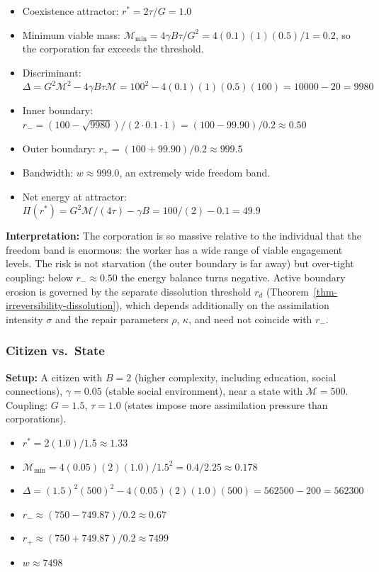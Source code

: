 \documentclass[11pt]{article}
\theoremstyle{plain}
\theoremstyle{definition}
\theoremstyle{remark}
\let\origsubsubsection\subsubsection
\renewcommand{\subsubsection}{\needspace{4\baselineskip}\origsubsubsection}
\providecommand{\tightlist}{%
  \setlength{\itemsep}{0pt}\setlength{\parskip}{0pt}}
\begin{document}
\begin{itemize}
\tightlist
\item
  Coexistence attractor: \(r^* = 2\tau/G = 1.0\)
\item
  Minimum viable mass:
  \(\mathcal{M}_{\min} = 4\gamma B \tau / G^2 = 4(0.1)(1)(0.5)/1 = 0.2\),
  so the corporation far exceeds the threshold.
\item
  Discriminant:
  \(\Delta = G^2\mathcal{M}^2 - 4\gamma B \tau \mathcal{M} = 100^2 - 4(0.1)(1)(0.5)(100) = 10000 - 20 = 9980\)
\item
  Inner boundary:
  \(r_- = (100 - \sqrt{9980})/(2 \cdot 0.1 \cdot 1) = (100 - 99.90)/0.2 \approx 0.50\)
\item
  Outer boundary: \(r_+ = (100 + 99.90)/0.2 \approx 999.5\)
\item
  Bandwidth: \(w \approx 999.0\), an extremely wide freedom band.
\item
  Net energy at attractor:
  \(\Pi(r^*) = G^2\mathcal{M}/(4\tau) - \gamma B = 100/(2) - 0.1 = 49.9\)
\end{itemize}

\textbf{Interpretation:} The corporation is so massive relative to the
individual that the freedom band is enormous: the worker has a wide
range of viable engagement levels. The risk is not starvation (the outer
boundary is far away) but over-tight coupling: below
\(r_- \approx 0.50\) the energy balance turns negative. Active boundary
erosion is governed by the separate dissolution threshold \(r_d\)
(Theorem~\ref{thm-irreversibility-dissolution}), which depends
additionally on the assimilation intensity \(\sigma\) and the repair
parameters \(\rho\), \(\kappa\), and need not coincide with \(r_-\).

\subsubsection{Citizen vs.~State}\label{citizen-vs.-state}

\textbf{Setup:} A citizen with \(B = 2\) (higher complexity, including
education, social connections), \(\gamma = 0.05\) (stable social
environment), near a state with \(\mathcal{M} = 500\). Coupling:
\(G = 1.5\), \(\tau = 1.0\) (states impose more assimilation pressure
than corporations).

\begin{itemize}
\tightlist
\item
  \(r^* = 2(1.0)/1.5 \approx 1.33\)
\item
  \(\mathcal{M}_{\min} = 4(0.05)(2)(1.0)/1.5^2 = 0.4/2.25 \approx 0.178\)
\item
  \(\Delta = (1.5)^2(500)^2 - 4(0.05)(2)(1.0)(500) = 562500 - 200 = 562300\)
\item
  \(r_- \approx (750 - 749.87)/0.2 \approx 0.67\)
\item
  \(r_+ \approx (750 + 749.87)/0.2 \approx 7499\)
\item
  \(w \approx 7498\)
\end{itemize}
\end{document}
